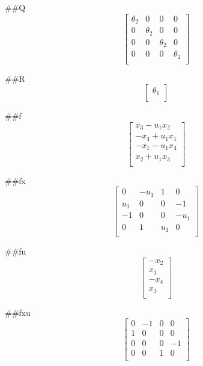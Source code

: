 ##Q
\begin{equation}
\left[
\begin{array}{cccc}
\theta_2 & 0 & 0 & 0 \\
0 & \theta_2 & 0 & 0 \\
0 & 0 & \theta_2 & 0 \\
0 & 0 & 0 & \theta_2 \\
\end{array}
\right]
\end{equation}


##R
\begin{equation}
\left[
\begin{array}{c}
\theta_1 \\
\end{array}
\right]
\end{equation}


##f
\begin{equation}
\left[
\begin{array}{c}
x_3 - u_1 x_2 \\
 - x_4 + u_1 x_1 \\
 - x_1 - u_1 x_4 \\
x_2 + u_1 x_3 \\
\end{array}
\right]
\end{equation}


##fx
\begin{equation}
\left[
\begin{array}{cccc}
0 &  - u_1 & 1 & 0 \\
u_1 & 0 & 0 & -1 \\
-1 & 0 & 0 &  - u_1 \\
0 & 1 & u_1 & 0 \\
\end{array}
\right]
\end{equation}


##fu
\begin{equation}
\left[
\begin{array}{c}
 - x_2 \\
x_1 \\
 - x_4 \\
x_3 \\
\end{array}
\right]
\end{equation}


##fxu
\begin{equation}
\left[
\begin{array}{cccc}
0 & -1 & 0 & 0 \\
1 & 0 & 0 & 0 \\
0 & 0 & 0 & -1 \\
0 & 0 & 1 & 0 \\
\end{array}
\right]
\end{equation}


